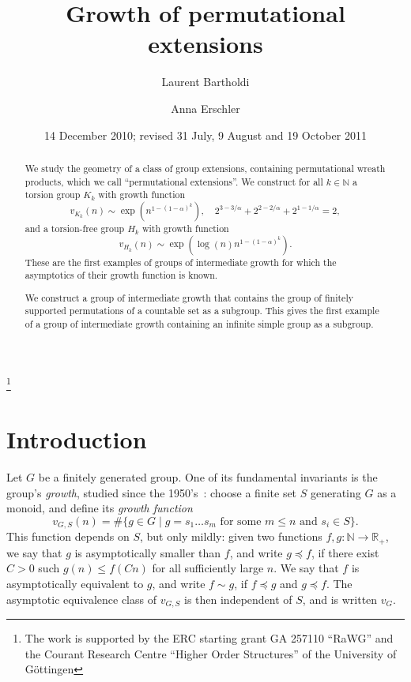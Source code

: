 \documentclass{amsart}
\newcommand\N{\mathbb{N}}
\newcommand\R{\mathbb{R}}
\theoremstyle{definition}
\begin{document}
\title{Growth of permutational extensions}
\author{Laurent Bartholdi}
\author{Anna Erschler}
\date{14 December 2010; revised 31 July, 9 August and 19 October 2011}
\thanks{The work is supported by the ERC starting grant GA 257110
  ``RaWG'' and the Courant Research Centre ``Higher Order Structures''
  of the University of G\"ottingen}

\begin{abstract}
  We study the geometry of a class of group extensions, containing
  permutational wreath products, which we call ``permutational
  extensions''. We construct for all $k\in\N$ a torsion
  group $K_k$ with growth function
  \[ v_{K_k}(n)\sim\exp(n^{1-(1-\alpha)^k}),\quad 2^{3-3/\alpha}+2^{2-2/\alpha}+2^{1-1/\alpha}=2,\]
  and a torsion-free group $H_k$ with growth function
  \[v_{H_k}(n)\sim\exp(\log(n)n^{1-(1-\alpha)^k}).
  \]
  These are the first examples of groups of intermediate growth for
  which the asymptotics of their growth function is known.

  We construct a group of intermediate growth that contains the group
  of finitely supported permutations of a countable set as a
  subgroup. This gives the first example of a group of intermediate
  growth containing an infinite simple group as a subgroup.
\end{abstract}
\maketitle

\section{Introduction}

Let $G$ be a finitely generated group. One of its fundamental
invariants is the group's \emph{growth}, studied since the
1950's~\cites{krause:growth,svarts:growth}: choose a finite set $S$
generating $G$ as a monoid, and define its \emph{growth function}
\[v_{G,S}(n)=\#\{g\in G\mid g=s_1\dots s_m\text{ for some $m\le n$ and
  $s_i\in S$}\}.
\]
This function depends on $S$, but only mildly: given two functions $f,
g: \N \to \R_+$, we say that $g$ is asymptotically smaller than $f$,
and write $g \preceq f$, if there exist $C>0$ such $g(n) \le f(C n)$
for all sufficiently large $n$. We say that $f$ is asymptotically
equivalent to $g$, and write $f \sim g$, if $f \preceq g$ and $g
\preceq f$.  The asymptotic equivalence class of $v_{G,S}$ is
then independent of $S$, and is written $v_G$.
\end{document}
